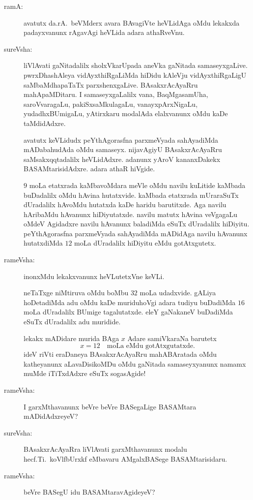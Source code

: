 \begin{description}
\item[ramA:] avatutx da.rA.\ beVMderx avara BAvagiVte heVLidAga oMdu lekakxda padayxvanunx rAgavAgi heVLida adara athaRveVnu.

\item[sureVsha:] liVlAvati gaNitadalilx sholxVkarUpada aneVka gaNitada samaseyxgaLive. pwrxDha\-shAleya vidAyxthiRgaLiMda hiDidu kAleVju vidAyxthiRgaLigU saMbaMdhapaTaTx parxshenxgaLive. BAsakxrAcAyaRru mahApaMDitaru. I samaseyxgaLalilx vana, BaqMgasamUha, saroVvaragaLu, pakiSxsaMkulagaLu, vanayxpArxNigaLu, yudadhxBUmigaLu, yAtirxkaru modalAda elalxvanunx oMdu kaDe taMdidAdxre.

avatutx keVLidudx peYthAgorasfna parxmeVyada sahAyadiMda mADa\-bahudAda oMdu samaseyx. nijavAgiyU BAsakxrAcAyaRru saMsakxqqtadalilx heVLidAdxre. adanunx yAroV kananxDakekx BASAMtarisidAdxre. adara athaR hiVgide.

\qquad $9$ moLa etatxrada kaMbavoMdara meVle oMdu navilu kuLitide kaMbada buDadalilx oMdu hAvina hutatxvide. kaMbada etatxrada mUraraSuTx dUradalilx hAvoMdu hutatxda kaDe haridu barutitxde. Aga navilu hAribaMdu hAvanunx hiDiyutatxde. navilu matutx hAvina veVgagaLu oMdeV Agidadxre navilu hAvanunx baladiMda eSuTx dUradalilx hiDiyitu. peYthAgorasfna parxmeVyada sahAyadiMda mADidAga navilu hAvanunx hutatxdiMda $12$ moLa dUradalilx hiDiyitu eMdu gotAtxgutetx.

\item[rameVsha:] inonxMdu lekakxvanunx heVLutetxVne keVLi.

\qquad neTaTxge niMtiruva oMdu boMbu $32$ moLa udadxvide. gALiya hoDetadiMda adu oMdu kaDe muriduhoVgi adara tudiyu buDadiMda $16$ moLa dUradalilx BUmige tagalutatxde. eleY gaNakaneV buDadiMda eSuTx dUradalilx adu muridide.

lekakx mADidare murida BAga $x$ Adare samiVkaraNa barutetx
$$
x=12\text{~~ moLa eMdu gotAtxgutatxde.}
$$
ideV riVti eraDaneya BAsakxrAcAyaRru mahABAratada oMdu katheyanunx aLavaDisikoMDu oMdu gaNitada samaseyxyanunx namamx muMde iTiTxdAdxre eSuTx sogasAgide!

\item[rameVsha:] I garxMthavanunx beVre beVre BASegaLige BASAMtara mADidAdxreyeV?

\item[sureVsha:] BAsakxrAcAyaRra liVlAvati garxMthavanunx modalu hecf.Ti.\ koVlfbUrxkf eMbavaru AMgalxBASege BASAMtarisidaru.

\item[rameVsha:] beVre BASegU idu BASAMtaravAgideyeV?


\end{description}
